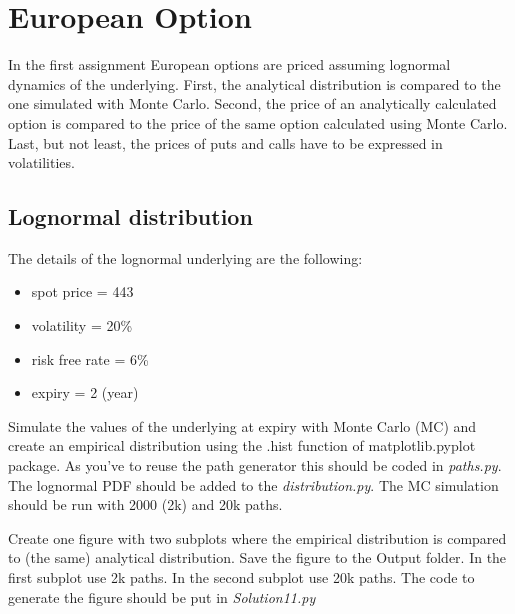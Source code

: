 \documentclass{article}
\begin{document}
\section{European Option} %

In the first assignment European options are priced assuming lognormal dynamics of the underlying. 
First, the analytical distribution is compared to the one simulated with Monte Carlo. 
Second, the price of an analytically calculated option is compared to the price of the same option calculated using Monte Carlo. 
Last, but not least, the prices of puts and calls have to be expressed in volatilities.

\newpage
\subsection{Lognormal distribution}
\label{sec:LNDistribution}
\begin{info} %
The details of the lognormal underlying are the following:
    \begin{itemize}
      \item spot price  = 443
      \item volatility = 20\%
      \item risk free rate = 6\%
      \item expiry = 2 (year)
    \end{itemize}
\end{info}
Simulate the values of the underlying at expiry with Monte Carlo (MC) and create an empirical distribution using the .hist function of matplotlib.pyplot package. 
As you've to reuse the path generator this should be coded in \textit{paths.py}. 
The lognormal PDF should be added to the \textit{distribution.py}. 
The MC simulation should be run with 2000 (2k) and 20k paths.

\begin{warn}[Deliverable 02:]
  Create one figure with two subplots where the empirical distribution is compared to (the same) analytical distribution. 
  Save the figure to the Output folder. 
  In the first subplot use 2k paths. 
  In the second subplot use 20k paths. 
  The code to generate the figure should be put in \textit{Solution11.py}
\end{warn}
\end{document}
